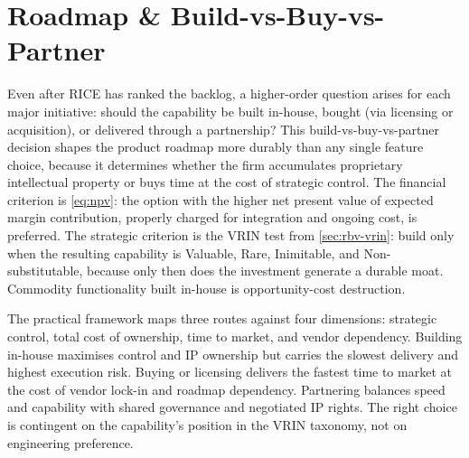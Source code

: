 \section{Roadmap \& Build-vs-Buy-vs-Partner}\label{sec:roadmap}

Even after RICE has ranked the backlog, a higher-order question arises for each major
initiative: should the capability be built in-house, bought (via licensing or acquisition),
or delivered through a partnership? This build-vs-buy-vs-partner decision shapes the
product roadmap more durably than any single feature choice, because it determines
whether the firm accumulates proprietary intellectual property or buys time at the cost
of strategic control. The financial criterion is \cref{eq:npv}: the option with the
higher net present value of expected margin contribution, properly charged for integration
and ongoing cost, is preferred. The strategic criterion is the VRIN test from
\cref{sec:rbv-vrin}: build only when the resulting capability is Valuable, Rare, Inimitable,
and Non-substitutable, because only then does the investment generate a durable moat.
Commodity functionality built in-house is opportunity-cost destruction.

The practical framework maps three routes against four dimensions: strategic control,
total cost of ownership, time to market, and vendor dependency. Building in-house
maximises control and IP ownership but carries the slowest delivery and highest execution
risk. Buying or licensing delivers the fastest time to market at the cost of vendor lock-in
and roadmap dependency. Partnering balances speed and capability with shared governance
and negotiated IP rights. The right choice is contingent on the capability's position in
the VRIN taxonomy, not on engineering preference.

